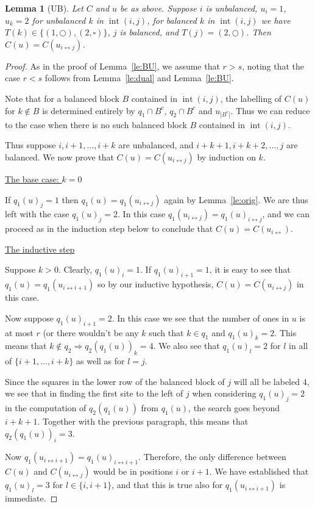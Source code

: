 \documentclass[reqno]{amsart}
\newcommand{\0}{\phantom{c}}
\DeclareMathOperator{\inter}{int} %
\theoremstyle{plain}
\newtheorem{lemma}[thm]{Lemma}
\theoremstyle{definition}
\numberwithin{equation}{section}
\begin{document}

\begin{lemma}[UB]
\label{le:UB}
  Let $C$ and $u$ be as above. Suppose $i$ is unbalanced, $u_i = 1$, $u_k = 2$ for unbalanced $k$ in $\inter(i,j)$, for balanced $k$ in $\inter(i,j)$ we have $T(k) \in \{(1,\bigcirc),(2,\square)\}$, $j$ is balanced, and $T(j) = (2,\bigcirc)$. Then $C(u) = C(u_{i \leftrightarrow j})$.
\end{lemma}

\begin{proof}
  As in the proof of Lemma~\ref{le:BU}, we assume that $r > s$, noting that the case $r < s$ follows from Lemma~\ref{le:dual} and Lemma~\ref{le:BU}.
  
  Note that for a balanced block $B$ contained in $\inter(i,j)$, the labelling of $C(u)$ for $k \notin B$ is determined entirely by $q_1\cap B^c$, $q_2\cap B^c$ and $u_{|B^c|}$. Thus we can reduce to the case when there is no such balanced block $B$ contained in $\inter(i,j)$.  

  Thus suppose $i, i+1, \dotsc, i+k$ are unbalanced, and $i+k+1, i+k+2, \dotsc, j$ are balanced. We now prove that $C(u) = C(u_{i\leftrightarrow j})$ by induction on $k$. 
  
  \vspace{10pt}
  \noindent \underline{The base case: $k = 0$}

  If $q_1(u)_j = 1$ then $q_1(u) = q_1(u_{i\leftrightarrow j})$ again by Lemma~\ref{le:orig}. We are thus left with the case $q_1(u)_j = 2$. In this case $q_1(u_{i\leftrightarrow j}) = q_1(u)_{i\leftrightarrow j}$, and we can proceed as in the induction step below to conclude that $C(u) = C(u_{i\leftrightarrow})$.

  \vspace{10pt}
  \noindent \underline{The inductive step}

  Suppose $k > 0$. Clearly, $q_1(u)_i = 1$. If $q_1(u)_{i+1} = 1$, it is easy to see that $q_1(u) = q_1(u_{i\leftrightarrow i+1})$ so by our inductive hypothesis, $C(u) = C(u_{i\leftrightarrow j})$ in this case. 

  Now suppose $q_1(u)_{i+1} = 2$. In this case we see that the number of ones in $u$ is at most $r$ (or there wouldn't be any $k$ such that $k \in q_1$ and $q_1(u)_k=2$. This means that $k\notin q_2 \Rightarrow q_2(q_1(u))_k = 4$. We also see that $q_1(u)_l = 2$ for $l$ in all of $\{i+1,\dots, i+k\}$ as well as for $l= j$.

  Since the squares in the lower row of the balanced block of $j$ will all be labeled $4$, we see that in finding the first site to the left of $j$ when considering $q_1(u)_j = 2$ in the computation of $q_2(q_1(u))$ from $q_1(u)$, the search goes beyond $i+k+1$. Together with the previous paragraph, this means that $q_2(q_1(u))_i = 3$.

  Now $q_1(u_{i\leftrightarrow i+1}) = q_1(u)_{i\leftrightarrow i+1}$. Therefore, the only difference between $C(u)$ and $C(u_{i\leftrightarrow j})$ would be in positions $i$ or $i+1$. We have established that $q_1(u)_l = 3$ for $l \in \{i,i+1\}$, and that this is true also for $q_1(u_{i\leftrightarrow i+1})$ is immediate.
\end{proof}
\end{document}
